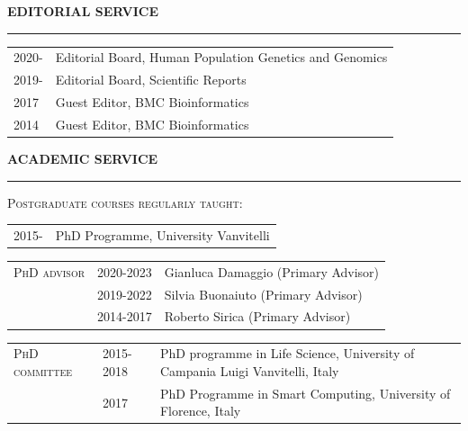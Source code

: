 \documentclass[openany]{book}
\begin{document}
\vspace{0.05cm}
\noindent
\MakeUppercase{\textbf{Editorial Service}} \vspace{0.2cm}
\sectionlineskip
\hrule
\vspace{0.2cm}
\noindent
\begin{tabular}{ l l }
2020- & Editorial Board, Human Population Genetics and Genomics \\
2019- & Editorial Board, Scientific Reports \\
2017 & Guest Editor, BMC Bioinformatics\\
2014 & Guest Editor, BMC Bioinformatics\\
\end{tabular}
\newline 


\vspace{0.05cm}
\noindent
\MakeUppercase{\textbf{Academic Service}} \vspace{0.2cm}
\sectionlineskip
\hrule
\vspace{0.2cm}
\noindent
\textsc{Postgraduate courses regularly taught:} \\
\begin{tabular}{l l }
2015- & PhD Programme, University Vanvitelli 
\end{tabular}
\newline 

\noindent 
\begin{tabular}{l l l}
\textsc{PhD advisor} & 2020-2023 & Gianluca Damaggio (Primary Advisor) \\
 & 2019-2022 & Silvia Buonaiuto (Primary Advisor)\\
 & 2014-2017 & Roberto Sirica (Primary Advisor)\\
\end{tabular}
\newline 

\noindent
\begin{tabular}{l l l}
\textsc{PhD committee} & 2015-2018 & PhD programme in Life Science, University of Campania Luigi Vanvitelli, Italy\\
 & 2017 & PhD Programme in Smart Computing, University of Florence, Italy
\end{tabular}
\newline
\end{document}
